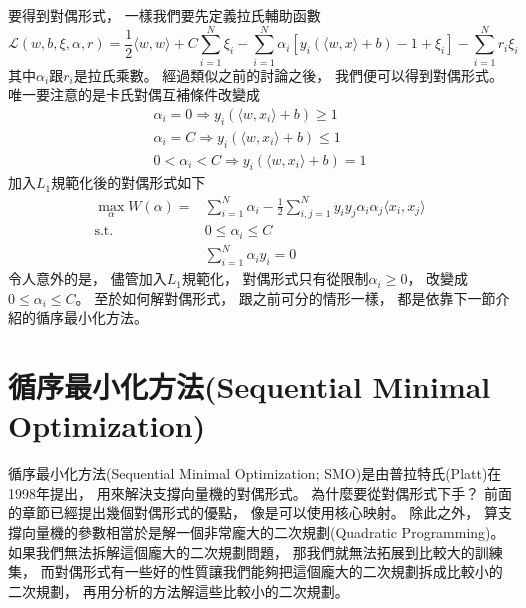   要得到對偶形式，
  一樣我們要先定義拉氏輔助函數
  \begin{equation}
    \mathcal{L}(w, b, \xi, \alpha, r) = \frac{1}{2} \langle w, w \rangle + C \sum_{i=1}^N \xi_i - \sum_{i=1}^N \alpha_i [y_i (\langle w, x \rangle + b) - 1 + \xi_i ] - \sum_{i=1}^N r_i \xi_i
  \end{equation}
  其中$\alpha_i$跟$r_i$是拉氏乘數。
  經過類似之前的討論之後，
  我們便可以得到對偶形式。
  唯一要注意的是卡氏對偶互補條件改變成
  \begin{align}
    \alpha_i = 0 \Rightarrow y_i (\langle w, x_i \rangle + b) \geq 1 \\
    \alpha_i = C \Rightarrow y_i (\langle w, x_i \rangle + b) \leq 1 \\
    0 < \alpha_i < C \Rightarrow y_i (\langle w, x_i \rangle + b) = 1
  \end{align}
  加入$L_1$規範化後的對偶形式如下
  \begin{equation}
    \begin{split}
      \max_{\alpha} W(\alpha) = &\sum_{i=1}^N \alpha_i - \frac{1}{2} \sum_{i,j=1}^N y_i y_j \alpha_i \alpha_j \langle x_i, x_j \rangle \\
      \text{s.t.} &0 \leq \alpha_i \leq C \\
      &\sum_{i=1}^N \alpha_i y_i = 0
    \end{split}
  \end{equation}
  令人意外的是，
  儘管加入$L_1$規範化，
  對偶形式只有從限制$\alpha_i \geq 0$，
  改變成$0 \leq \alpha_i \leq C$。
  至於如何解對偶形式，
  跟之前可分的情形一樣，
  都是依靠下一節介紹的循序最小化方法。

\section{循序最小化方法(Sequential Minimal Optimization)} \label{sec:SMO}
  循序最小化方法(Sequential Minimal Optimization; SMO)是由普拉特氏(Platt)在1998年提出\cite{Microsoft98SMO}，
  用來解決支撐向量機的對偶形式。
  為什麼要從對偶形式下手？
  前面的章節已經提出幾個對偶形式的優點，
  像是可以使用核心映射。
  除此之外，
  算支撐向量機的參數相當於是解一個非常龐大的二次規劃(Quadratic Programming)。
  如果我們無法拆解這個龐大的二次規劃問題，
  那我們就無法拓展到比較大的訓練集，
  而對偶形式有一些好的性質讓我們能夠把這個龐大的二次規劃拆成比較小的二次規劃，
  再用分析的方法解這些比較小的二次規劃。


